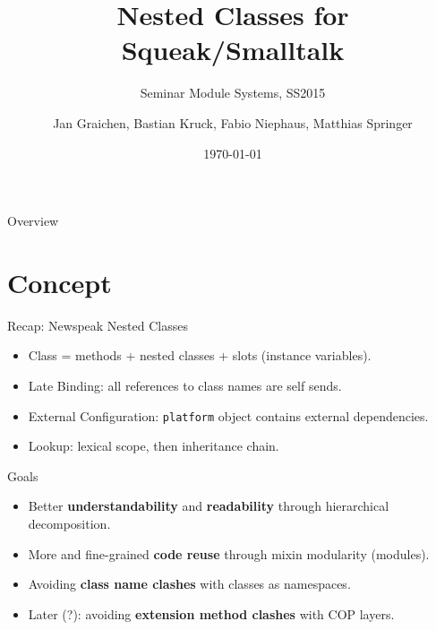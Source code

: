 \documentclass[xcolor=dvipsname, handout]{beamer} %
\title{Nested Classes for Squeak/Smalltalk}
\subtitle{Seminar Module Systems, SS2015}
\author{Jan Graichen, Bastian Kruck, Fabio Niephaus, Matthias Springer}
\date{\today}
\institute[2015]{Software Architecture Group, Hasso Plattner Institute}
\begin{document}
\begin{frame}[plain]
	\maketitle
\end{frame}
\begin{frame}{Overview}
	\tableofcontents[hideallsubsections]
\end{frame}


\section{Concept}
\begin{frame}{Recap: Newspeak Nested Classes}
  \begin{itemize}
    \item Class = methods + nested classes + slots (instance variables).
    \item Late Binding: all references to class names are self sends.
    \item External Configuration: \texttt{platform} object contains external dependencies.
    \item Lookup: lexical scope, then inheritance chain.
  \end{itemize}
\end{frame}

\begin{frame}{Goals}
  \begin{itemize}
    \item Better \textbf{understandability} and \textbf{readability} through hierarchical decomposition.
    \item More and fine-grained \textbf{code reuse} through mixin modularity (modules).
    \item Avoiding \textbf{class name clashes} with classes as namespaces.
    \item Later (?): avoiding \textbf{extension method clashes} with COP layers.
  \end{itemize}
\end{frame}
\end{document}
